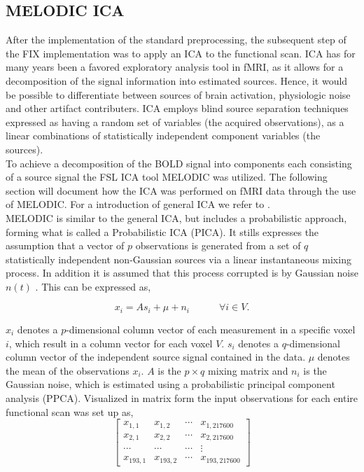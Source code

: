 \subsection{MELODIC ICA}

After the implementation of the standard preprocessing, the subsequent step of the FIX implementation was to apply an ICA to the functional scan. ICA has for many years been a favored exploratory analysis tool in fMRI, as it allows for a decomposition of the signal information into estimated sources. Hence, it would be possible to differentiate between sources of brain activation, physiologic noise and other artifact contributers. ICA employs blind source separation techniques expressed as having a random set of variables (the acquired observations), as a linear combinations of statistically independent component variables (the sources). \cite{Beckmann2004} \\
To achieve a decomposition of the BOLD signal into components each consisting of a source signal the FSL ICA tool MELODIC was utilized. The following section will document how the ICA was performed on fMRI data through the use of MELODIC. For a introduction of general ICA we refer to . \\


MELODIC is similar to the general ICA, but includes a probabilistic approach, forming what is called a Probabilistic ICA (PICA). It stills expresses the assumption that a vector of $p$ observations is generated from a set of $q$ statistically independent non-Gaussian sources via a linear instantaneous mixing process. In addition it is assumed that this process corrupted is by Gaussian noise $n(t)$ \cite{Beckmann2004}. This can be expressed as, 

\begin{equation}
x_i = As_i + \mu + n_i  \hspace{3em} \forall i \in V.
\end{equation}     

$x_i$ denotes a $p$-dimensional column vector of each measurement in a specific voxel $i$, which result in a column vector for each voxel $V$. $s_i$ denotes a $q$-dimensional column vector of the independent source signal contained in the data. $\mu$ denotes the mean of the observations $x_i$. $A$ is the $p\times q$ mixing matrix and $n_i$ is the Gaussian noise, which is estimated using a probabilistic principal component analysis (PPCA). Visualized in matrix form the input observations for each entire functional scan was set up as,
\begin{equation}
 \begin{bmatrix}
x_{1,1} & x_{1,2} & \cdots & x_{1,217600} \\
x_{2,1} & x_{2,2} & \cdots & x_{2,217600} \\
\cdots & \cdots & \cdots & \vdots \\
x_{193,1} & x_{193,2} & \cdots & x_{193,217600} 
\end{bmatrix}  
\end{equation}

